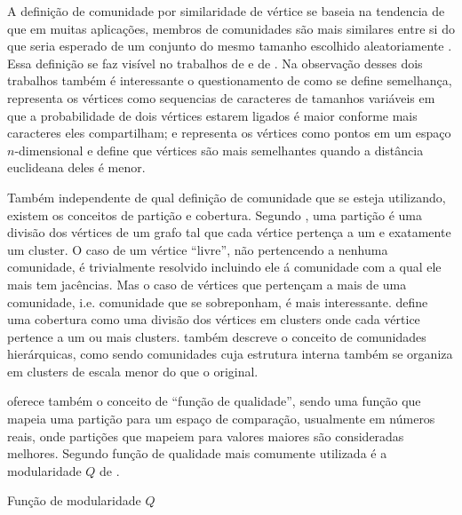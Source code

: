 \documentclass[notes.tex]{subfiles}
\begin{document}
A definição de comunidade por similaridade de vértice se baseia na tendencia de que em muitas aplicações, membros de comunidades são mais similares entre si do que seria esperado de um conjunto do mesmo tamanho escolhido aleatoriamente \cite{fortunato2010community}.
Essa definição se faz visível no trabalhos de  e de .
Na observação desses dois trabalhos também é interessante o questionamento de como se define semelhança,  representa os vértices como sequencias de caracteres de tamanhos variáveis em que a probabilidade de dois vértices estarem ligados é maior conforme mais caracteres eles compartilham; e  representa os vértices como pontos em um espaço $n$-dimensional e define que vértices são mais semelhantes quando a distância euclideana deles é menor.

Também independente de qual definição de comunidade que se esteja utilizando, existem os conceitos de partição e cobertura.
Segundo , uma partição é uma divisão dos vértices de um grafo tal que cada vértice pertença a um e exatamente um cluster.
O caso de um vértice ``livre'', não pertencendo a nenhuma comunidade, é trivialmente resolvido incluindo ele á comunidade com a qual ele mais tem jacências.
Mas o caso de vértices que pertençam a mais de uma comunidade, i.e. comunidade que se sobreponham, é mais interessante.
 define uma cobertura como uma divisão dos vértices em clusters onde cada vértice pertence a um ou mais clusters.
 também descreve o conceito de comunidades hierárquicas, como sendo comunidades cuja estrutura interna também se organiza em clusters de escala menor do que o original.

 oferece também o conceito de ``função de qualidade'', sendo uma função que mapeia uma partição para um espaço de comparação, usualmente em números reais, onde partições que mapeiem para valores maiores são consideradas melhores.
Segundo  função de qualidade mais comumente utilizada é a modularidade $Q$ de .

\begin{quadro}[htb]
\caption{\label{qua:mod_q}Função de modularidade $Q$}

    \begin{equasion}
    \end{equasion}

\end{quadro}
\end{document}
